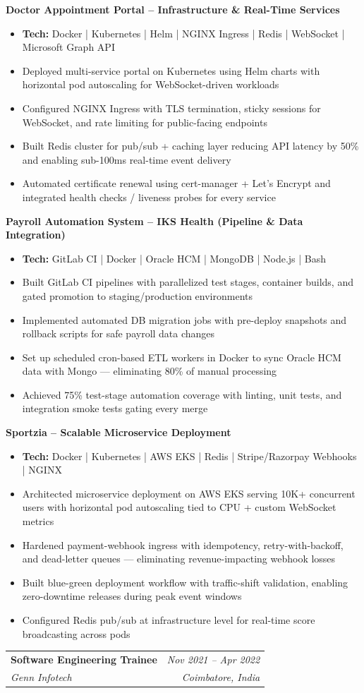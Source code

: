 \documentclass[11pt]{article}
\makeatletter
\newcommand{\resumeSubheading}[4]{
    \vspace{0.5pt}
    \begin{tabularx}{\textwidth}{@{}X r@{}}
        \textbf{\color{textgray}#1} & \color{textgray}\textit{#2} \\
        \textit{#3} & \textit{#4}
    \end{tabularx}
    \vspace{0.5pt}
}
\newcommand{\projectheading}[1]{
    \vspace{0.5pt}
    \textbf{\color{accentblue}#1}
    \vspace{0.5pt}
}
\makeatother
\begin{document}
\projectheading{Doctor Appointment Portal -- Infrastructure \& Real-Time Services}
\begin{itemize}
    \item \textbf{Tech:} Docker | Kubernetes | Helm | NGINX Ingress | Redis | WebSocket | Microsoft Graph API
    \item Deployed multi-service portal on Kubernetes using Helm charts with horizontal pod autoscaling for WebSocket-driven workloads
    \item Configured NGINX Ingress with TLS termination, sticky sessions for WebSocket, and rate limiting for public-facing endpoints
    \item Built Redis cluster for pub/sub + caching layer reducing API latency by 50\% and enabling sub-100ms real-time event delivery
    \item Automated certificate renewal using cert-manager + Let's Encrypt and integrated health checks / liveness probes for every service
\end{itemize}

\projectheading{Payroll Automation System -- IKS Health (Pipeline \& Data Integration)}
\begin{itemize}
    \item \textbf{Tech:} GitLab CI | Docker | Oracle HCM | MongoDB | Node.js | Bash
    \item Built GitLab CI pipelines with parallelized test stages, container builds, and gated promotion to staging/production environments
    \item Implemented automated DB migration jobs with pre-deploy snapshots and rollback scripts for safe payroll data changes
    \item Set up scheduled cron-based ETL workers in Docker to sync Oracle HCM data with Mongo — eliminating 80\% of manual processing
    \item Achieved 75\% test-stage automation coverage with linting, unit tests, and integration smoke tests gating every merge
\end{itemize}

\projectheading{Sportzia -- Scalable Microservice Deployment}
\begin{itemize}
    \item \textbf{Tech:} Docker | Kubernetes | AWS EKS | Redis | Stripe/Razorpay Webhooks | NGINX
    \item Architected microservice deployment on AWS EKS serving 10K+ concurrent users with horizontal pod autoscaling tied to CPU + custom WebSocket metrics
    \item Hardened payment-webhook ingress with idempotency, retry-with-backoff, and dead-letter queues — eliminating revenue-impacting webhook losses
    \item Built blue-green deployment workflow with traffic-shift validation, enabling zero-downtime releases during peak event windows
    \item Configured Redis pub/sub at infrastructure level for real-time score broadcasting across pods
\end{itemize}
\vspace{0pt}
\resumeSubheading
    {Software Engineering Trainee}{Nov 2021 -- Apr 2022}
    {Genn Infotech}{Coimbatore, India}
\end{document}
